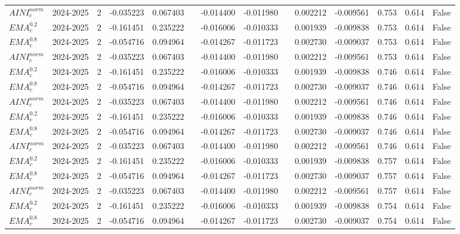 \begin{tabular}{@{}llrrrrrrrrrlll@{}}
$AINI^{norm}_{c}$ & 2024-2025 & 2 & -0.035223 & 0.067403 &  & -0.014400 & -0.011980 &  & 0.002212 & -0.009561 & 0.753 & 0.614 & False \\
$EMA^{0.2}_{c}$ & 2024-2025 & 2 & -0.161451 & 0.235222 &  & -0.016006 & -0.010333 &  & 0.001939 & -0.009838 & 0.753 & 0.614 & False \\
$EMA^{0.8}_{c}$ & 2024-2025 & 2 & -0.054716 & 0.094964 &  & -0.014267 & -0.011723 &  & 0.002730 & -0.009037 & 0.753 & 0.614 & False \\
$AINI^{norm}_{c}$ & 2024-2025 & 2 & -0.035223 & 0.067403 &  & -0.014400 & -0.011980 &  & 0.002212 & -0.009561 & 0.753 & 0.614 & False \\
$EMA^{0.2}_{c}$ & 2024-2025 & 2 & -0.161451 & 0.235222 &  & -0.016006 & -0.010333 &  & 0.001939 & -0.009838 & 0.746 & 0.614 & False \\
$EMA^{0.8}_{c}$ & 2024-2025 & 2 & -0.054716 & 0.094964 &  & -0.014267 & -0.011723 &  & 0.002730 & -0.009037 & 0.746 & 0.614 & False \\
$AINI^{norm}_{c}$ & 2024-2025 & 2 & -0.035223 & 0.067403 &  & -0.014400 & -0.011980 &  & 0.002212 & -0.009561 & 0.746 & 0.614 & False \\
$EMA^{0.2}_{c}$ & 2024-2025 & 2 & -0.161451 & 0.235222 &  & -0.016006 & -0.010333 &  & 0.001939 & -0.009838 & 0.746 & 0.614 & False \\
$EMA^{0.8}_{c}$ & 2024-2025 & 2 & -0.054716 & 0.094964 &  & -0.014267 & -0.011723 &  & 0.002730 & -0.009037 & 0.746 & 0.614 & False \\
$AINI^{norm}_{c}$ & 2024-2025 & 2 & -0.035223 & 0.067403 &  & -0.014400 & -0.011980 &  & 0.002212 & -0.009561 & 0.746 & 0.614 & False \\
$EMA^{0.2}_{c}$ & 2024-2025 & 2 & -0.161451 & 0.235222 &  & -0.016006 & -0.010333 &  & 0.001939 & -0.009838 & 0.757 & 0.614 & False \\
$EMA^{0.8}_{c}$ & 2024-2025 & 2 & -0.054716 & 0.094964 &  & -0.014267 & -0.011723 &  & 0.002730 & -0.009037 & 0.757 & 0.614 & False \\
$AINI^{norm}_{c}$ & 2024-2025 & 2 & -0.035223 & 0.067403 &  & -0.014400 & -0.011980 &  & 0.002212 & -0.009561 & 0.757 & 0.614 & False \\
$EMA^{0.2}_{c}$ & 2024-2025 & 2 & -0.161451 & 0.235222 &  & -0.016006 & -0.010333 &  & 0.001939 & -0.009838 & 0.754 & 0.614 & False \\
$EMA^{0.8}_{c}$ & 2024-2025 & 2 & -0.054716 & 0.094964 &  & -0.014267 & -0.011723 &  & 0.002730 & -0.009037 & 0.754 & 0.614 & False \\

\end{tabular}
